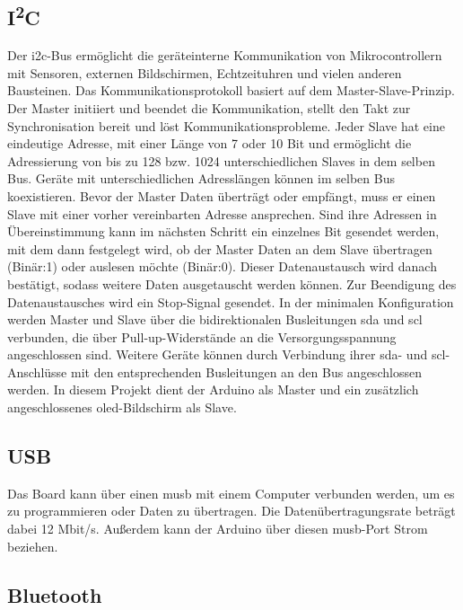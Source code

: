 \subsection{I\textsuperscript{2}C}

Der \ac{i2c}-Bus ermöglicht die geräteinterne Kommunikation von Mikrocontrollern mit Sensoren, externen Bildschirmen, Echtzeituhren und vielen anderen Bausteinen. Das Kommunikationsprotokoll basiert auf dem Master-Slave-Prinzip. Der Master initiiert und beendet die Kommunikation, stellt den Takt zur Synchronisation bereit und löst Kommunikationsprobleme. Jeder Slave hat eine eindeutige Adresse, mit einer Länge von 7 oder 10 Bit und ermöglicht die Adressierung von bis zu 128 bzw. 1024 unterschiedlichen Slaves in dem selben Bus. Geräte mit unterschiedlichen Adresslängen können im selben Bus koexistieren. Bevor der Master Daten überträgt oder empfängt, muss er einen Slave mit einer vorher vereinbarten Adresse ansprechen.\cite{Meroth.2021}\cite{STM1.2015}\cite{Bernstein.2020} Sind ihre Adressen in Übereinstimmung kann im nächsten Schritt ein einzelnes Bit gesendet werden, mit dem dann festgelegt wird, ob der Master Daten an dem Slave übertragen (Binär:1) oder auslesen möchte (Binär:0). Dieser Datenaustausch wird danach bestätigt, sodass weitere Daten ausgetauscht werden können. Zur Beendigung des Datenaustausches wird ein Stop-Signal gesendet.\cite{Gehrke.2022} In der minimalen Konfiguration werden Master und Slave über die bidirektionalen Busleitungen \ac{sda} und \ac{scl} verbunden, die über Pull-up-Widerstände an die Versorgungsspannung angeschlossen sind. Weitere Geräte können durch Verbindung ihrer \ac{sda}- und \ac{scl}-Anschlüsse mit den entsprechenden Busleitungen an den Bus angeschlossen werden.\cite{Meroth.2021} In diesem Projekt dient der Arduino als Master und ein zusätzlich angeschlossenes \ac{oled}-Bildschirm als Slave.

\subsection{USB}

Das Board kann über einen \ac{musb} mit einem Computer verbunden werden, um es zu programmieren oder Daten zu übertragen. Die Datenübertragungsrate beträgt dabei 12 Mbit/s. Außerdem kann der Arduino über diesen \ac{musb}-Port Strom beziehen.

\subsection{Bluetooth}

